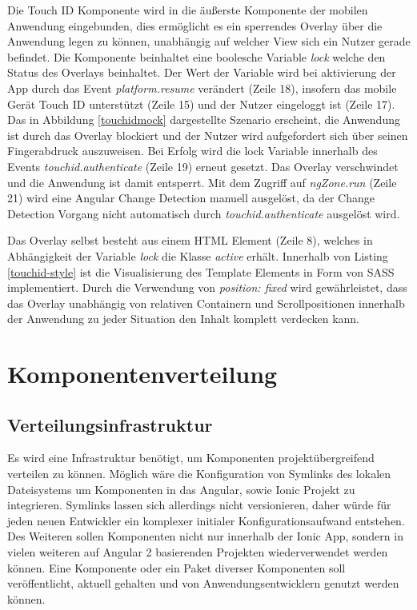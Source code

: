 Die Touch ID Komponente wird in die äußerste Komponente der mobilen Anwendung eingebunden,
dies ermöglicht es ein sperrendes Overlay über die Anwendung legen zu können, unabhängig auf welcher
View sich ein Nutzer gerade befindet. Die Komponente beinhaltet eine boolesche Variable \emph{lock}
welche den Status des Overlays beinhaltet. Der Wert der Variable wird bei aktivierung der App durch das Event \emph{platform.resume}
verändert (Zeile 18), insofern das mobile Gerät Touch ID unterstützt (Zeile 15) und der Nutzer eingeloggt ist (Zeile 17).
Das in Abbildung \ref{touchidmock} dargestellte Szenario erscheint, die Anwendung ist durch das Overlay blockiert und der Nutzer wird aufgefordert sich über seinen Fingerabdruck auszuweisen.
Bei Erfolg wird die lock Variable innerhalb des Events \emph{touchid.authenticate} (Zeile 19) erneut gesetzt.
Das Overlay verschwindet und die Anwendung ist damit entsperrt. Mit dem Zugriff auf \emph{ngZone.run} (Zeile 21) wird eine Angular Change Detection manuell ausgelöst, da der Change Detection Vorgang nicht automatisch durch \emph{touchid.authenticate} ausgelöst wird.

Das Overlay selbst besteht aus einem \ac{HTML} Element (Zeile 8), welches in Abhängigkeit der Variable \emph{lock} die Klasse \emph{active} erhält.
Innerhalb von Listing \ref{touchid-style} ist die Visualisierung des Template Elements in Form von \ac{SASS} implementiert.
Durch die Verwendung von \emph{position: fixed} wird gewährleistet, dass das Overlay unabhängig von relativen Containern und Scrollpositionen innerhalb der Anwendung zu jeder Situation den Inhalt komplett verdecken kann.









\newpage
\section{Komponentenverteilung}

\subsection{Verteilungsinfrastruktur}

Es wird eine Infrastruktur benötigt, um Komponenten projektübergreifend verteilen zu können.
Möglich wäre die Konfiguration von Symlinks des lokalen Dateisystems um Komponenten in das Angular,
sowie Ionic Projekt zu integrieren. Symlinks lassen sich allerdings nicht versionieren, daher würde
für jeden neuen Entwickler ein komplexer initialer Konfigurationsaufwand entstehen.
Des Weiteren sollen Komponenten nicht nur innerhalb der Ionic App,
sondern in vielen weiteren auf Angular 2 basierenden Projekten wiederverwendet werden können.
Eine Komponente oder ein Paket diverser Komponenten soll veröffentlicht, aktuell
gehalten und von Anwendungsentwicklern genutzt werden können.

